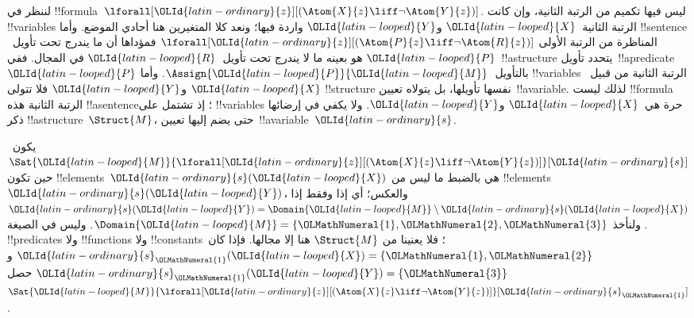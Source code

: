 \documentclass[../../../include/open-logic-section]{subfiles}
\begin{document}
\begin{ex}
  لننظر في !!{formula}~$\lforall[{\OLId{latin-ordinary}{z}}][(\Atom{X}{z} \liff \lnot
    \Atom{Y}{z})]$. ليس فيها تكميم من الرتبة الثانية، وإن كانت
  !!{variable}s الرتبة الثانية~${\OLId{latin-looped}{X}}$ و${\OLId{latin-looped}{Y}}$ واردة فيها؛ ونعد كلا
  المتغيرين هنا أحادي الموضع. وأما !!{sentence} المناظرة من الرتبة
  الأولى
  $\lforall[{\OLId{latin-ordinary}{z}}][(\Atom{P}{z} \liff \lnot \Atom{R}{z})]$ فمؤداها أن
  ما يندرج تحت تأويل~${\OLId{latin-looped}{P}}$ هو بعينه ما لا يندرج تحت تأويل~${\OLId{latin-looped}{R}}$ في المجال.
  ففي~!!a{structure} يتحدد تأويل~!!a{predicate}~${\OLId{latin-looped}{P}}$
  بالتأويل~$\Assign{{\OLId{latin-looped}{P}}}{{\OLId{latin-looped}{M}}}$. وأما !!{variable}s الرتبة الثانية
  من قبيل~${\OLId{latin-looped}{X}}$ و${\OLId{latin-looped}{Y}}$ فلا تتولى !!{structure} نفسها تأويلها، بل يتولاه
  تعيين~!!a{variable}. لذلك ليست !!{formula} الرتبة الثانية هذه
  !!a{sentence}؛ إذ تشتمل على !!{variable}s حرة هي~${\OLId{latin-looped}{X}}$ و${\OLId{latin-looped}{Y}}$.
  ولا يكفي في إرضائها ذكر !!a{structure}~$\Struct{M}$، حتى يضم
  إليها تعيين~!!a{variable}~${\OLId{latin-ordinary}{s}}$.

  يكون~$\Sat{{\OLId{latin-looped}{M}}}{\lforall[{\OLId{latin-ordinary}{z}}][(\Atom{X}{z} \liff \lnot
    \Atom{Y}{z})]}[{\OLId{latin-ordinary}{s}}]$ حين تكون !!{element}s~${\OLId{latin-ordinary}{s}}({\OLId{latin-looped}{X}})$ هي بالضبط
  ما ليس من !!{element}s~${\OLId{latin-ordinary}{s}}({\OLId{latin-looped}{Y}})$، والعكس؛ أي إذا وفقط إذا
  ${\OLId{latin-ordinary}{s}}({\OLId{latin-looped}{Y}}) = \Domain{{\OLId{latin-looped}{M}}} \setminus {\OLId{latin-ordinary}{s}}({\OLId{latin-looped}{X}})$. ولنأخذ
  $\Domain{{\OLId{latin-looped}{M}}} = \{{\OLMathNumeral{1}}, {\OLMathNumeral{2}}, {\OLMathNumeral{3}}\}$. وليس في الصيغة !!{predicate}s
  ولا !!{function}s ولا !!{constant}s؛ فلا يعنينا من
  $\Struct{M}$ هنا إلا مجالها.
  فإذا كان~${\OLId{latin-ordinary}{s}}_{\OLMathNumeral{1}}({\OLId{latin-looped}{X}}) = \{{\OLMathNumeral{1}}, {\OLMathNumeral{2}}\}$ و${\OLId{latin-ordinary}{s}}_{\OLMathNumeral{1}}({\OLId{latin-looped}{Y}}) = \{{\OLMathNumeral{3}}\}$ حصل
  $\Sat{{\OLId{latin-looped}{M}}}{\lforall[{\OLId{latin-ordinary}{z}}][(\Atom{X}{z}
      \liff \lnot \Atom{Y}{z})]}[{\OLId{latin-ordinary}{s}}_{\OLMathNumeral{1}}]$.


\end{ex}
\end{document}
